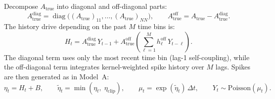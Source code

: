 \documentclass[11pt]{article}
\begin{document}
Decompose $A_{\text{true}}$ into diagonal and off-diagonal parts:
\begin{equation}
  A_{\text{true}}^{\mathrm{diag}}
  = \operatorname{diag}\!\bigl((A_{\text{true}})_{11},\dots,
    (A_{\text{true}})_{NN}\bigr),
  \qquad
  A_{\text{true}}^{\mathrm{off}}
  = A_{\text{true}} - A_{\text{true}}^{\mathrm{diag}}.
\end{equation}
The history drive depending on the past $M$ time bins is: 
\begin{equation}
  H_t
  = A_{\text{true}}^{\mathrm{diag}}\,Y_{t-1}
  + A_{\text{true}}^{\mathrm{off}}
    \!\left(\sum_{\ell=1}^{M}
    h^{\mathrm{off}}_\ell\,Y_{t-\ell}\right). 
  \label{eq:histB}
\end{equation}
The diagonal term uses only the most recent time bin (lag-1 self-coupling),
while the off-diagonal term integrates kernel-weighted spike history
over $M$ lags.
Spikes are then generated as in Model~A:
\begin{equation}
  \eta_t = H_t + B,
  \qquad
  \tilde{\eta}_t = \min(\eta_t,\;\eta_{\mathrm{clip}}),
  \qquad
  \mu_t = \exp(\tilde{\eta}_t)\,\Delta t,
  \qquad
  Y_t \sim \mathrm{Poisson}(\mu_t).
  \label{eq:lagM_gen}
\end{equation}
\end{document}
